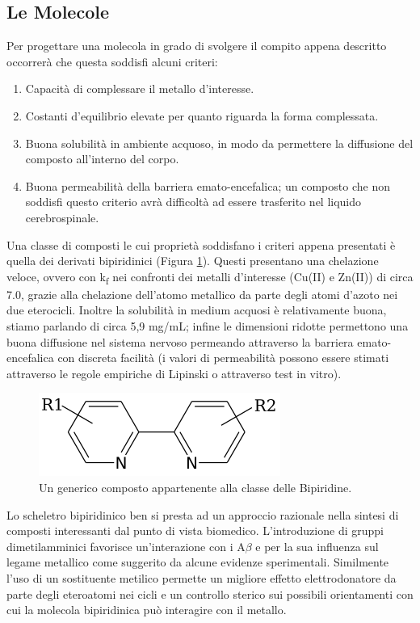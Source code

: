 \documentclass[a4paper, 12pt]{article}
\begin{document}
\subsection{Le Molecole}
\label{sec:bpy_mol}
Per progettare una molecola in grado di svolgere il compito appena descritto occorrerà che questa soddisfi alcuni criteri:
\begin{enumerate}
	\item Capacità di complessare il metallo d'interesse.
	\item Costanti d'equilibrio elevate per quanto riguarda la forma complessata.
	\item Buona solubilità in ambiente acquoso, in modo da permettere la diffusione del composto all'interno del corpo.
	\item Buona permeabilità della barriera emato-encefalica; un composto che non soddisfi questo criterio avrà difficoltà ad essere trasferito nel liquido cerebrospinale.
\end{enumerate}
Una classe di composti le cui proprietà soddisfano i criteri appena presentati è quella dei derivati bipiridinici (Figura \ref{fig:bpy}).
Questi presentano una chelazione veloce, ovvero con k\textsubscript{f} nei confronti dei metalli d'interesse (Cu(II) e Zn(II)) di circa 7.0, grazie alla chelazione dell'atomo metallico da parte degli atomi d'azoto nei due eterocicli. Inoltre la solubilità in medium acquosi è relativamente buona, stiamo parlando di circa 5,9 mg/mL; infine le dimensioni ridotte permettono una buona diffusione nel sistema nervoso permeando attraverso la barriera emato-encefalica con discreta facilità (i valori di permeabilità possono essere stimati attraverso le regole empiriche di Lipinski o attraverso test in vitro). \cite{di_high_2003}
\begin{figure}[H]
	\centering
	\includegraphics[width=.5\linewidth]{immagini/bpy.png}
	\caption{Un generico composto appartenente alla classe delle Bipiridine.}
	\label{fig:bpy}
\end{figure}
Lo scheletro bipiridinico ben si presta ad un approccio razionale nella sintesi di composti interessanti dal punto di vista biomedico.
L'introduzione di gruppi dimetilamminici favorisce un'interazione con i A$\beta$ e per la sua influenza sul legame metallico come suggerito da alcune evidenze sperimentali. Similmente l'uso di un sostituente metilico permette un migliore effetto elettrodonatore da parte degli eteroatomi nei cicli e un controllo sterico sui possibili orientamenti con cui la molecola bipiridinica può interagire con il metallo. \cite{derrick_importance_2016,savelieff_ongoing_2014}
\end{document}
